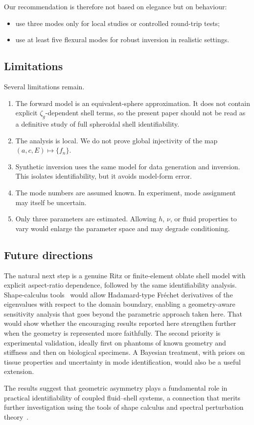 Our recommendation is therefore not based on elegance but on behaviour:
\begin{itemize}
  \item use three modes only for local studies or controlled round-trip tests;
  \item use at least five flexural modes for robust inversion in realistic
  settings.
\end{itemize}

\subsection{Limitations}

Several limitations remain.
\begin{enumerate}
  \item The forward model is an equivalent-sphere approximation.  It does not
  contain explicit $\zeta_g$-dependent shell terms, so the present paper should
  not be read as a definitive study of full spheroidal shell identifiability.
  \item The analysis is local.  We do not prove global injectivity of the map
  $(a,c,E)\mapsto \{f_n\}$.
  \item Synthetic inversion uses the same model for data generation and
  inversion.  This isolates identifiability, but it avoids model-form error.
  \item The mode numbers are assumed known.  In experiment, mode assignment may
  itself be uncertain.
  \item Only three parameters are estimated.  Allowing $h$, $\nu$, or fluid
  properties to vary would enlarge the parameter space and may degrade
  conditioning.
\end{enumerate}

\subsection{Future directions}

The natural next step is a genuine Ritz or finite-element oblate shell model
with explicit aspect-ratio dependence, followed by the same identifiability
analysis.  Shape-calculus tools~\cite{DelfourZolesio2011} would allow
Hadamard-type Fr\'echet derivatives of the eigenvalues with respect to the
domain boundary, enabling a geometry-aware sensitivity analysis that goes beyond
the parametric approach taken here.  That would show whether the encouraging
results reported here strengthen further when the geometry is represented more
faithfully.  The second
priority is experimental validation, ideally first on phantoms of known
geometry and stiffness and then on biological specimens.  A Bayesian treatment,
with priors on tissue properties and uncertainty in mode identification, would
also be a useful extension.

The results suggest that geometric asymmetry plays a fundamental role in
practical identifiability of coupled fluid--shell systems, a connection that
merits further investigation using the tools of shape calculus and spectral
perturbation theory~\cite{Kato1966,Henrot2006}.
